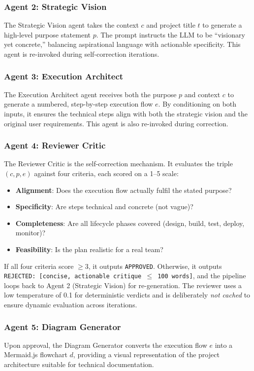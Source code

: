 \documentclass[journal]{IEEEtran}
\begin{document}
\subsubsection{Agent 2: Strategic Vision}
The Strategic Vision agent takes the context $c$ and project title $t$ to generate a high-level purpose statement $p$. The prompt instructs the LLM to be ``visionary yet concrete,'' balancing aspirational language with actionable specificity. This agent is re-invoked during self-correction iterations.

\subsubsection{Agent 3: Execution Architect}
The Execution Architect agent receives both the purpose $p$ and context $c$ to generate a numbered, step-by-step execution flow $e$. By conditioning on both inputs, it ensures the technical steps align with both the strategic vision and the original user requirements. This agent is also re-invoked during correction.

\subsubsection{Agent 4: Reviewer Critic}
The Reviewer Critic is the self-correction mechanism. It evaluates the triple $(c, p, e)$ against four criteria, each scored on a 1--5 scale:

\begin{itemize}
    \item \textbf{Alignment}: Does the execution flow actually fulfil the stated purpose?
    \item \textbf{Specificity}: Are steps technical and concrete (not vague)?
    \item \textbf{Completeness}: Are all lifecycle phases covered (design, build, test, deploy, monitor)?
    \item \textbf{Feasibility}: Is the plan realistic for a real team?
\end{itemize}

If all four criteria score $\geq 3$, it outputs \texttt{APPROVED}. Otherwise, it outputs \texttt{REJECTED: [concise, actionable critique $\leq$ 100 words]}, and the pipeline loops back to Agent 2 (Strategic Vision) for re-generation. The reviewer uses a low temperature of 0.1 for deterministic verdicts and is deliberately \textit{not cached} to ensure dynamic evaluation across iterations.

\subsubsection{Agent 5: Diagram Generator}
Upon approval, the Diagram Generator converts the execution flow $e$ into a Mermaid.js flowchart $d$, providing a visual representation of the project architecture suitable for technical documentation.
\end{document}
